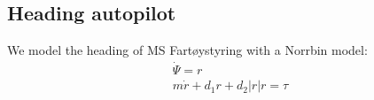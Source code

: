 \subsection{Heading autopilot}\label{sec:prob1.1}
We model the heading of MS Fartøystyring with a Norrbin model:
\begin{equation}
\begin{split}
\dot{\Psi} = r \\
m\dot{r}+d_1r+d_2|r|r=\tau
\end{split}
\end{equation}
